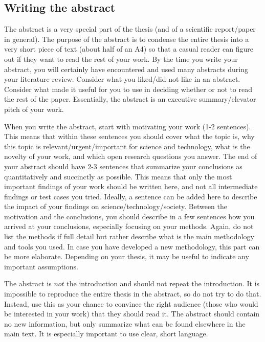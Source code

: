 \documentclass{article}
\begin{document}
\subsection{Writing the abstract}
The abstract is a very special part of the thesis (and of a scientific report/paper in general). The purpose of the abstract is to condense the entire thesis into a very short piece of text (about half of an A4) so that a casual reader can figure out if they want to read the rest of your work. By the time you write your abstract, you will certainly have encountered and used many abstracts during your literature review. Consider what you liked/did not like in an abstract. Consider what made it useful for you to use in deciding whether or not to read the rest of the paper. Essentially, the abstract is an executive summary/elevator pitch of your work. 

When you write the abstract, start with motivating your work (1-2 sentences). This means that within these sentences you should cover what the topic is, why this topic is relevant/urgent/important for science and technology, what is the novelty of your work, and which open research questions you answer. The end of your abstract should have 2-3 sentences that summarize your conclusions as quantitatively and succinctly as possible. This means that only the most important findings of your work should be written here, and not all intermediate findings or test cases you tried. Ideally, a sentence can be added here to describe the impact of your findings on science/technology/society. Between the motivation and the conclusions, you should describe in a few sentences how you arrived at your conclusions, especially focusing on your methods. Again, do not list the methods if full detail but rather describe what is the main methodology and tools you used. In case you have developed a new methodology, this part can be more elaborate. Depending on your thesis, it may be useful to indicate any important assumptions. 

The abstract is $not$ the introduction and should not repeat the introduction. It is impossible to reproduce the entire thesis in the abstract, so do not try to do that. Instead, use this as your chance to convince the right audience (those who would be interested in your work) that they should read it. The abstract should contain no new information, but only summarize what can be found elsewhere in the main text. It is especially important to use clear, short language.
\end{document}
